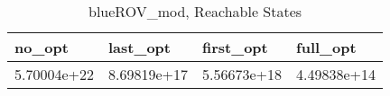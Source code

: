 \begin{table}
\caption{blueROV\_mod, Reachable States}
\label{blueROV_mod_reach}
\begin{tabular}{llll}
\toprule
no\_opt & last\_opt & first\_opt & full\_opt \\
\midrule
5.70004e+22 & 8.69819e+17 & 5.56673e+18 & 4.49838e+14 \\
\bottomrule
\end{tabular}
\end{table}
